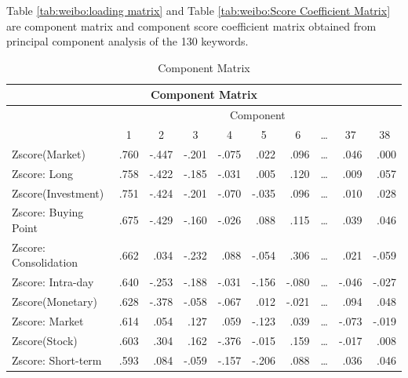 \documentclass[review,3p,times,12pt,number]{elsarticle}
\begin{document}
Table \ref{tab:weibo:loading matrix} and Table \ref{tab:weibo:Score Coefficient Matrix} are component matrix and component score coefficient matrix obtained from principal component analysis of the 130 keywords.

\begin{table}[htbp]
  \scriptsize
  \centering
  \caption{Component Matrix}
     \begin{tabular}{rrrrrrrrrr}
    \toprule
    \multicolumn{10}{c}{\textbf{Component Matrix}} \\
    \midrule
    \multicolumn{1}{l}{\multirow{2}[4]{*}{}} & \multicolumn{9}{c}{Component} \\
    \multicolumn{1}{l}{} & \multicolumn{1}{c}{1} & \multicolumn{1}{c}{2} & \multicolumn{1}{c}{3} & \multicolumn{1}{c}{4} & \multicolumn{1}{c}{5} & \multicolumn{1}{c}{6} & \multicolumn{1}{c}{\ldots} & \multicolumn{1}{c}{37} & \multicolumn{1}{c}{38} \\
    \multicolumn{1}{l}{Zscore(Market)} & .760  & -.447 & -.201 & -.075 & .022  & .096  & \ldots     & .046  & .000 \\
    \multicolumn{1}{l}{Zscore:  Long} & .758  & -.422 & -.185 & -.031 & .005  & .120  & \ldots     & .009  & .057 \\
    \multicolumn{1}{l}{Zscore(Investment)} & .751  & -.424 & -.201 & -.070 & -.035 & .096  & \ldots     & .010  & .028 \\
    \multicolumn{1}{l}{Zscore:  Buying Point} & .675  & -.429 & -.160 & -.026 & .088  & .115  & \ldots     & .039  & .046 \\
    \multicolumn{1}{l}{Zscore:  Consolidation} & .662  & .034  & -.232 & .088  & -.054 & .306  & \ldots     & .021  & -.059 \\
    \multicolumn{1}{l}{Zscore:  Intra-day} & .640  & -.253 & -.188 & -.031 & -.156 & -.080 & \ldots     & -.046 & -.027 \\
    \multicolumn{1}{l}{Zscore(Monetary)} & .628  & -.378 & -.058 & -.067 & .012  & -.021 & \ldots     & .094  & .048 \\
    \multicolumn{1}{l}{Zscore:  Market} & .614  & .054  & .127  & .059  & -.123 & .039  & \ldots     & -.073 & -.019 \\
    \multicolumn{1}{l}{Zscore(Stock)} & .603  & .304  & .162  & -.376 & -.015 & .159  & \ldots     & -.017 & .008 \\
    \multicolumn{1}{l}{Zscore:  Short-term} & .593  & .084  & -.059 & -.157 & -.206 & .088  & \ldots     & .036  & .046 \\

\end{tabular}
\end{table}
\end{document}
